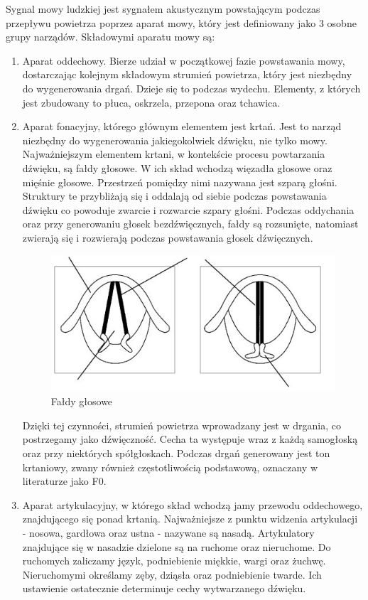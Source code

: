 \documentclass[a4paper,12 pt]{article}
\begin{document}
Sygnal mowy ludzkiej jest sygnałem akustycznym powstającym podczas przepływu powietrza poprzez aparat mowy, który jest definiowany jako 3 osobne grupy narządów. 
Składowymi aparatu mowy są:
\begin{enumerate}
\item Aparat oddechowy. Bierze udział w początkowej fazie powstawania mowy, dostarczając kolejnym składowym strumień powietrza, który jest niezbędny do wygenerowania drgań. Dzieje się to podczas wydechu. Elementy, z których jest zbudowany to płuca, oskrzela, przepona oraz tchawica.

\item Aparat fonacyjny, którego głównym elementem jest krtań. Jest to narząd niezbędny do wygenerowania jakiegokolwiek dźwięku, nie tylko mowy. Najważniejszym elementem krtani, w kontekście procesu powtarzania dźwięku, są fałdy głosowe. W ich skład wchodzą więzadła głosowe oraz mięśnie głosowe. Przestrzeń pomiędzy nimi nazywana jest szparą głośni. Struktury te przybliżają się i oddalają od siebie podczas powstawania dźwięku co powoduje zwarcie i rozwarcie szpary głośni. Podczas oddychania oraz przy generowaniu głosek bezdźwięcznych, fałdy są rozsunięte, natomiast zwierają się  i rozwierają podczas powstawania głosek dźwięcznych. 

\begin{figure}[!htbp]

\centering
\includegraphics{faldy_glosowe}
\caption{Fałdy głosowe}

\end{figure}
\FloatBarrier

Dzięki tej czynności, strumień powietrza wprowadzany jest w drgania, co postrzegamy jako dźwięczność. Cecha ta występuje wraz z każdą samogłoską oraz przy niektórych spółgłoskach. Podczas drgań generowany jest ton krtaniowy, zwany również częstotliwością podstawową, oznaczany w literaturze jako F0. 
\item Aparat artykulacyjny, w którego skład wchodzą jamy przewodu oddechowego, znajdującego się ponad krtanią. Najważniejsze z punktu widzenia artykulacji - nosowa, gardłowa oraz ustna - nazywane są nasadą. Artykulatory znajdujące się w nasadzie dzielone są na ruchome oraz nieruchome. Do ruchomych zaliczamy język, podniebienie miękkie, wargi oraz żuchwę. Nieruchomymi określamy zęby, dziąsła oraz podniebienie twarde. Ich ustawienie ostatecznie determinuje cechy wytwarzanego dźwięku. 
\end{enumerate}
\end{document}
